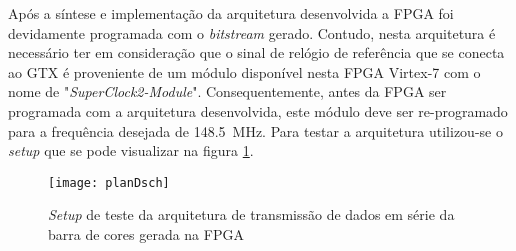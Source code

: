 %



Após a síntese e implementação da arquitetura desenvolvida a FPGA foi devidamente programada com o \textit{bitstream} gerado. Contudo, nesta arquitetura é necessário ter em consideração que o sinal de relógio de referência que se conecta ao GTX é proveniente de um módulo disponível nesta FPGA Virtex-7 com o nome de "\textit{SuperClock2-Module}". Consequentemente, antes da FPGA ser programada com a arquitetura desenvolvida, este módulo deve ser re-programado para a frequência desejada de \SI{148.5}{\mega\hertz}. Para testar a arquitetura utilizou-se o \textit{setup} que se pode visualizar na figura \ref{fig:planD_setup}.
\begin{figure}[h!]
	\begin{center}
		\leavevmode
		\texttt{[image: planDsch]}
		\captionsetup{width=1.0\linewidth}
		\caption[\textit{Setup} de teste da arquitetura]{\textit{Setup} de teste da arquitetura de transmissão de dados em série da barra de cores gerada na FPGA}
		\label{fig:planD_setup}
	\end{center}
\end{figure}

